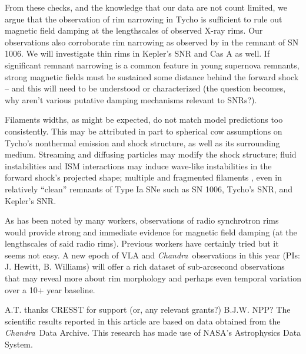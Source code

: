 \documentclass[iop, apj, numberedappendix, twocolappendix]{emulateapj}
\newcommand*{\Chandra}{\textit{Chandra}\ }
\begin{document}
From these checks, and the knowledge that our data are not count limited, we
argue that the observation of rim narrowing in Tycho is sufficient to
rule out magnetic field damping at the lengthscales of observed X-ray rims.
Our observations also corroborate rim narrowing as observed by
\citet{ressler2014} in the remnant of SN 1006.  We will investigate thin rims
in Kepler's SNR and Cas A \citep[but cf.][]{araya2010} as well.  If significant
remnant narrowing is a common feature in young supernova remnants, strong
magnetic fields must be sustained some distance behind the forward shock -- and
this will need to be understood or characterized (the question becomes, why
aren't various putative damping mechanisms relevant to SNRs?).

Filaments widths, as might be expected, do not match model predictions too
consistently.  This may be attributed in part to spherical cow assumptions on
Tycho's nonthermal emission and shock structure, as well as its surrounding
medium.  Streaming and diffusing particles may modify the shock structure;
fluid instabilities and ISM interactions may induce wave-like instabilities in
the forward shock's projected shape; multiple and fragmented filaments
\citep{caprioli2013},
even in relatively ``clean'' remnants of Type Ia SNe such as SN 1006, Tycho's
SNR, and Kepler's SNR. 

As has been noted by many workers, observations of radio synchrotron rims would
provide strong and immediate evidence for magnetic field damping (at the
lengthscales of said radio rims).  Previous workers have certainly tried
\citep{cassam-chenai2007, morlino2012} but it seems not easy.
A new epoch of VLA and \Chandra observations in this year (PIs: J. Hewitt, B.
Williams) will offer a rich dataset of sub-arcsecond observations that may
reveal more about rim morphology and perhaps even temporal variation over a 10+
year baseline.

\acknowledgments

A.T. thanks CRESST for support (or, any relevant grants?)
B.J.W. NPP?
The scientific results reported in this article are based on data obtained from
the \Chandra Data Archive.
This research has made use of NASA's Astrophysics Data System.
\end{document}
